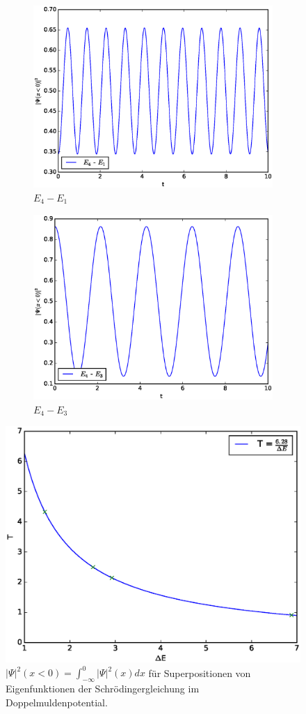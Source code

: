 \documentclass[a4paper, 11pt]{scrartcl}
\begin{document}
\begin{figure}[H]
\begin{subfigure}[b]{0.5\linewidth}
  \includegraphics[width=0.9\linewidth]{probability_left41}
  \caption{$E_4 - E_1$}
  \label{fig:41}
\end{subfigure}%
\begin{subfigure}[b]{0.5\linewidth}
  \centering
  \includegraphics[width=0.9\linewidth]{probability_left43}
  \caption{$E_4 - E_3$}
  \label{fig:43}
\end{subfigure}
\caption{$\vert \Psi \vert^2 (x < 0) = \int_{-\infty}^{0} \vert \Psi \vert^2(x) dx$ für Superpositionen von Eigenfunktionen der Schrödingergleichung im Doppelmuldenpotential.}
\label{fig:left_prob}
%
\centering
\includegraphics[width = .7\textwidth]{periodicity}

\end{figure}
\end{document}

